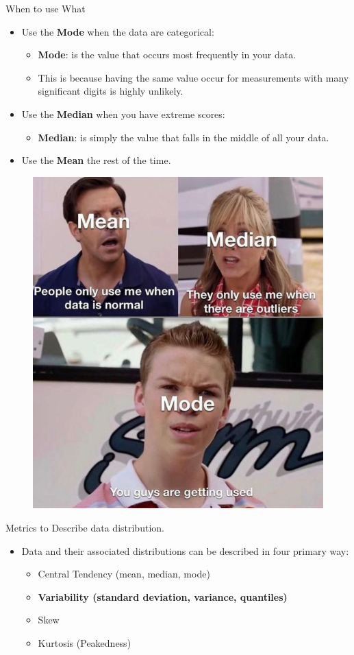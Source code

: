 \documentclass[
  ignorenonframetext,
]{beamer}
\providecommand{\tightlist}{%
  \setlength{\itemsep}{0pt}\setlength{\parskip}{0pt}}
\begin{document}
\begin{frame}{When to use What}
\label{when-to-use-what}
\begin{itemize}
\tightlist
\item
  Use the \textbf{Mode} when the data are categorical:

  \begin{itemize}
  \tightlist
  \item
    \textbf{Mode}: is the value that occurs most frequently in your
    data.\\
  \item
    This is because having the same value occur for measurements with
    many significant digits is highly unlikely.
  \end{itemize}
\end{itemize}

\begin{itemize}
\tightlist
\item
  Use the \textbf{Median} when you have extreme scores:

  \begin{itemize}
  \tightlist
  \item
    \textbf{Median}: is simply the value that falls in the middle of all
    your data.
  \end{itemize}
\end{itemize}

\begin{itemize}
\tightlist
\item
  Use the \textbf{Mean} the rest of the time.
\end{itemize}

\begin{figure}
\includegraphics[width=0.25\linewidth]{fig/CnetralTendency} \end{figure}
\end{frame}

\begin{frame}{Metrics to Describe data distribution.}
\label{metrics-to-describe-data-distribution.-2}
\begin{itemize}
\item
  Data and their associated distributions can be described in four
  primary way:

  \begin{itemize}
  \tightlist
  \item
    Central Tendency (mean, median, mode)
  \item
    \textbf{Variability (standard deviation, variance, quantiles)}
  \item
    Skew
  \item
    Kurtosis (Peakedness)
  \end{itemize}
\end{itemize}
\end{frame}
\end{document}

